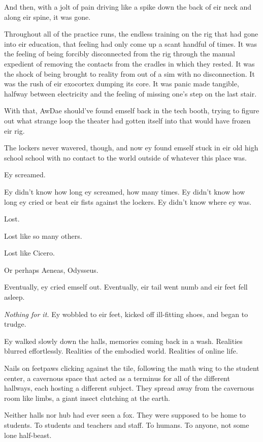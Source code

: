 And then, with a jolt of pain driving like a spike down the back of eir neck and along eir spine, it was gone.

Throughout all of the practice runs, the endless training on the rig that had gone into eir education, that feeling had only come up a scant handful of times. It was the feeling of being forcibly disconnected from the rig through the manual expedient of removing the contacts from the cradles in which they rested. It was the shock of being brought to reality from out of a sim with no disconnection. It was the rush of eir exocortex dumping its core. It was panic made tangible, halfway between electricity and the feeling of missing one's step on the last stair.

With that, AwDae should've found emself back in the tech booth, trying to figure out what strange loop the theater had gotten itself into that would have frozen eir rig.

The lockers never wavered, though, and now ey found emself stuck in eir old high school school with no contact to the world outside of whatever this place was.

Ey screamed.

Ey didn't know how long ey screamed, how many times. Ey didn't know how long ey cried or beat eir fists against the lockers. Ey didn't know where ey was.

Lost.

Lost like so many others.

Lost like Cicero.

Or perhaps Aeneas, Odysseus.

Eventually, ey cried emself out. Eventually, eir tail went numb and eir feet fell asleep.

\emph{Nothing for it.} Ey wobbled to eir feet, kicked off ill-fitting shoes, and began to trudge.

Ey walked slowly down the halls, memories coming back in a wash. Realities blurred effortlessly. Realities of the embodied world. Realities of online life.

Nails on feetpaws clicking against the tile, following the math wing to the student center, a cavernous space that acted as a terminus for all of the different hallways, each hosting a different subject. They spread away from the cavernous room like limbs, a giant insect clutching at the earth.

Neither halls nor hub had ever seen a fox. They were supposed to be home to students. To students and teachers and staff. To humans. To anyone, not some lone half-beast.

